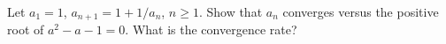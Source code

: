 Let $a_1 = 1$, $a_{n+1} = 1 + 1/a_n$, $n \geq 1$. Show that $a_n$ converges versus the positive root of $a^2 - a - 1 = 0$. What is the convergence rate?
